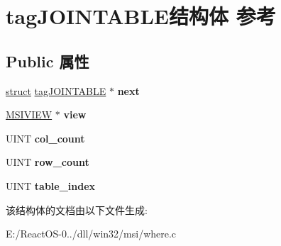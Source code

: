 \hypertarget{structtag_j_o_i_n_t_a_b_l_e}{}\section{tag\+J\+O\+I\+N\+T\+A\+B\+L\+E结构体 参考}
\label{structtag_j_o_i_n_t_a_b_l_e}
\subsection*{Public 属性}
\begin{DoxyCompactItemize}
\item 
\mbox{\label{structtag_j_o_i_n_t_a_b_l_e_afe55f15d69c16b26ee61e31334e31576}} 
\hyperlink{interfacestruct}{struct} \hyperlink{structtag_j_o_i_n_t_a_b_l_e}{tag\+J\+O\+I\+N\+T\+A\+B\+LE} $\ast$ {\bfseries next}
\item 
\mbox{\label{structtag_j_o_i_n_t_a_b_l_e_a8ad68ed55a6f5783504cc42abdfef1e5}} 
\hyperlink{structtag_m_s_i_v_i_e_w}{M\+S\+I\+V\+I\+EW} $\ast$ {\bfseries view}
\item 
\mbox{\label{structtag_j_o_i_n_t_a_b_l_e_a2ced9f3017548935049a3c85073cc569}} 
U\+I\+NT {\bfseries col\+\_\+count}
\item 
\mbox{\label{structtag_j_o_i_n_t_a_b_l_e_a9204b9647e285bf050bd378cd8612b62}} 
U\+I\+NT {\bfseries row\+\_\+count}
\item 
\mbox{\label{structtag_j_o_i_n_t_a_b_l_e_afbb7696a821ca2475116a00ae0f63614}} 
U\+I\+NT {\bfseries table\+\_\+index}
\end{DoxyCompactItemize}


该结构体的文档由以下文件生成\+:\begin{DoxyCompactItemize}
\item 
E\+:/\+React\+O\+S-\/0../dll/win32/msi/where.\+c\end{DoxyCompactItemize}
